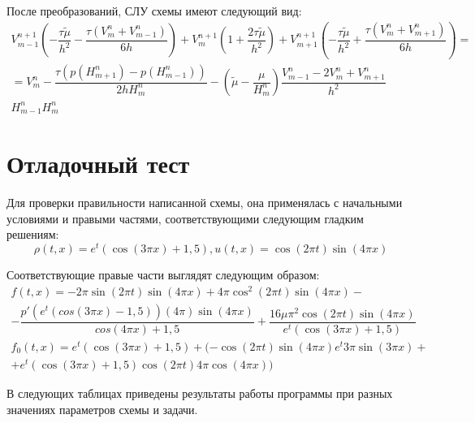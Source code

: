 \documentclass[12pt,a4paper]{article}
\begin{document}
После преобразований, СЛУ схемы имеют следующий вид:
\begin{gather*}
    V_{m-1}^{n+1}\left(-\dfrac{\tau\tilde{\mu}}{h^2}-\dfrac{\tau(V_{m}^n + V_{m-1}^n)}{6h}\right) + 
    V_{m}^{n+1}\left(1+\dfrac{2\tau\tilde{\mu}}{h^2}\right) +
    V_{m+1}^{n+1}\left(-\dfrac{\tau\tilde{\mu}}{h^2}+\dfrac{\tau(V_{m}^{n} + V_{m+1}^{n})}{6h} \right)= \\ =
    V_{m}^n-\dfrac{\tau(p(H_{m+1}^{n}) - p(H_{m-1}^n))}{2hH_m^n} -
    \left( \tilde{\mu} - \dfrac{\mu}{H_m^n} \right) \dfrac{V_{m-1}^n - 2V_{m}^n + V_{m+1}^n}{h^2} \\
    H_{m-1}^{n}
    H_{m}^{n}
\end{gather*}

\section{Отладочный тест}

Для проверки правильности написанной схемы, она применялась с начальными условиями и правыми частями, соответствующими следующим гладким решениям:
\begin{equation*}
    \rho(t, x) = e^t(\cos(3\pi x) + 1,\!5), u(t, x) = \cos(2\pi t)\sin(4\pi x)
\end{equation*}

Соответствующие правые части выглядят следующим образом:
\begin{gather*}
    f (t, x) = -2\pi \sin(2\pi t)\sin(4\pi x) + 4\pi\cos^2(2\pi t)\sin(4\pi x) - \\
    - \dfrac{p'(e^t(cos(3\pi x) - 1\!,5))(4\pi)\sin(4\pi x)}{cos(4\pi x) + 1,\!5} + \dfrac{16\mu\pi^2\cos(2\pi t)\sin(4\pi x)
}{e^t(\cos(3\pi x) + 1,\!5)}   \\
    f_0 (t, x) = e^t(\cos(3\pi x) + 1,\!5) + (-\cos(2\pi t)\sin(4\pi x)e^t3\pi\sin(3\pi x) +\\
    + e^t(\cos(3\pi x) + 1,\!5)\cos(2\pi t)4\pi\cos(4\pi x))
\end{gather*}

В следующих таблицах приведены результаты работы программы при разных значениях параметров схемы и задачи.
\end{document}
